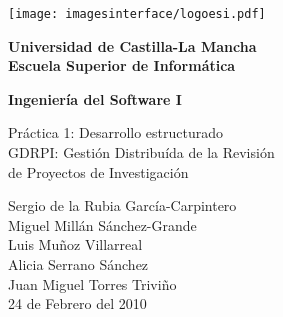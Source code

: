 \documentclass[12pt,a4paper,titlepage,spanish,twoside]{article}
\begin{document}
\thispagestyle{empty}
\vspace*{-2cm}

\begin{center}
  \texttt{[image: imagesinterface/logoesi.pdf]}
  
  \vspace*{1.5cm}
  {\Large \textbf{Universidad de Castilla-La Mancha\\ 
      Escuela Superior de Informática}\\}
    
  \vspace*{1.2cm}
  {\huge \textbf{Ingeniería del Software I}}
    
  \vspace*{1.5cm}
  {\huge Práctica 1: Desarrollo estructurado}\\
  {\Large GDRPI: Gestión Distribuída de la Revisión\\
    de Proyectos de Investigación\\} 
    
  \vspace*{1.5cm}
  {\large Sergio de la Rubia García-Carpintero\\
    Miguel Millán Sánchez-Grande\\Luis Muñoz Villarreal\\
    Alicia Serrano Sánchez\\Juan Miguel Torres Triviño\\} 
  \vfill
  \large{24 de Febrero del 2010}
\end{center}
\end{document}
